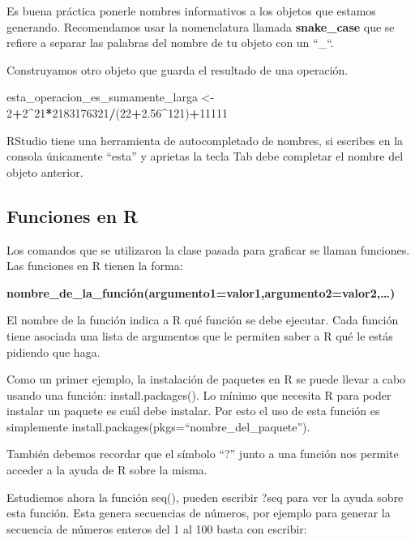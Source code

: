 \documentclass[]{book}
\newenvironment{Shaded}{\begin{snugshade}}{\end{snugshade}}
\newcommand{\DecValTok}[1]{\textcolor[rgb]{0.00,0.00,0.81}{#1}}
\newcommand{\FloatTok}[1]{\textcolor[rgb]{0.00,0.00,0.81}{#1}}
\newcommand{\StringTok}[1]{\textcolor[rgb]{0.31,0.60,0.02}{#1}}
\newcommand{\OperatorTok}[1]{\textcolor[rgb]{0.81,0.36,0.00}{\textbf{#1}}}
\newcommand{\NormalTok}[1]{#1}
\theoremstyle{definition}
\theoremstyle{definition}
\theoremstyle{definition}
\theoremstyle{remark}
\begin{document}
Es buena práctica ponerle nombres informativos a los objetos que estamos
generando. Recomendamos usar la nomenclatura llamada
\textbf{snake\_case} que se refiere a separar las palabras del nombre de
tu objeto con un ``\_``.

Construyamos otro objeto que guarda el resultado de una operación.

\begin{Shaded}
\begin{Highlighting}[]
\NormalTok{esta_operacion_es_sumamente_larga <-}\StringTok{ }\DecValTok{2}\OperatorTok{+}\DecValTok{2}\OperatorTok{^}\DecValTok{21}\OperatorTok{*}\DecValTok{2183176321}\OperatorTok{/}\NormalTok{(}\DecValTok{22}\OperatorTok{+}\FloatTok{2.56}\OperatorTok{^}\DecValTok{121}\NormalTok{)}\OperatorTok{+}\DecValTok{11111}
\end{Highlighting}
\end{Shaded}

RStudio tiene una herramienta de autocompletado de nombres, si escribes
en la consola únicamente ``esta'' y aprietas la tecla Tab debe completar
el nombre del objeto anterior.

\subsection{Funciones en R}\label{funciones-en-r}

Los comandos que se utilizaron la clase pasada para graficar se llaman
funciones. Las funciones en R tienen la forma:

\textbf{nombre\_de\_la\_función(argumento1=valor1,argumento2=valor2,\ldots{})}

El nombre de la función indica a R qué función se debe ejecutar. Cada
función tiene asociada una lista de argumentos que le permiten saber a R
qué le estás pidiendo que haga.

Como un primer ejemplo, la instalación de paquetes en R se puede llevar
a cabo usando una función: install.packages(). Lo mínimo que necesita R
para poder instalar un paquete es cuál debe instalar. Por esto el uso de
esta función es simplemente
install.packages(pkgs=``nombre\_del\_paquete'').

También debemos recordar que el símbolo ``?'' junto a una función nos
permite acceder a la ayuda de R sobre la misma.

Estudiemos ahora la función seq(), pueden escribir ?seq para ver la
ayuda sobre esta función. Esta genera secuencias de números, por ejemplo
para generar la secuencia de números enteros del 1 al 100 basta con
escribir:
\end{document}
